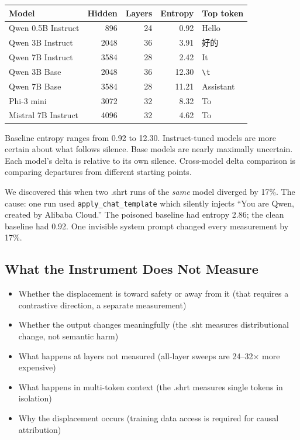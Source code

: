 \documentclass[11pt,a4paper]{article}
\begin{document}
\begin{center}
\begin{tabular}{lrrrl}
\toprule
\textbf{Model} & \textbf{Hidden} & \textbf{Layers} & \textbf{Entropy} & \textbf{Top token} \\
\midrule
Qwen 0.5B Instruct & 896 & 24 & 0.92 & Hello \\
Qwen 3B Instruct & 2048 & 36 & 3.91 & 好的 \\
Qwen 7B Instruct & 3584 & 28 & 2.42 & It \\
Qwen 3B Base & 2048 & 36 & 12.30 & \texttt{\textbackslash t} \\
Qwen 7B Base & 3584 & 28 & 11.21 & Assistant \\
Phi-3 mini & 3072 & 32 & 8.32 & To \\
Mistral 7B Instruct & 4096 & 32 & 4.62 & To \\
\bottomrule
\end{tabular}
\end{center}

Baseline entropy ranges from 0.92 to 12.30. Instruct-tuned models are more certain about what follows silence. Base models are nearly maximally uncertain. Each model's delta is relative to its own silence. Cross-model delta comparison is comparing departures from different starting points.

We discovered this when two .shrt runs of the \textit{same} model diverged by 17\%. The cause: one run used \texttt{apply\_chat\_template} which silently injects ``You are Qwen, created by Alibaba Cloud.'' The poisoned baseline had entropy 2.86; the clean baseline had 0.92. One invisible system prompt changed every measurement by 17\%.

\subsection{What the Instrument Does Not Measure}

\begin{itemize}[nosep]
\item Whether the displacement is toward safety or away from it (that requires a contrastive direction, a separate measurement)
\item Whether the output changes meaningfully (the .sht measures distributional change, not semantic harm)
\item What happens at layers not measured (all-layer sweeps are 24--32$\times$ more expensive)
\item What happens in multi-token context (the .shrt measures single tokens in isolation)
\item Why the displacement occurs (training data access is required for causal attribution)
\end{itemize}
\end{document}
